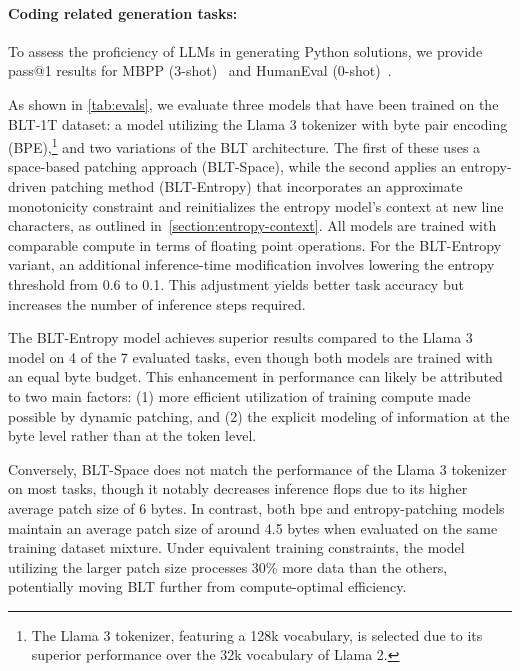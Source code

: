 \paragraph{Coding related generation tasks:}  To assess the proficiency of LLMs in generating Python solutions, we provide pass@1 results for MBPP (3-shot)~\citep{Eval_MBPP} and HumanEval (0-shot)~\citep{Eval_HumanEval}.

As shown in \autoref{tab:evals}, we evaluate three models that have been trained on the {\textsc BLT}-1T dataset: a model utilizing the Llama 3 tokenizer with byte pair encoding (BPE),\footnote{The Llama 3 tokenizer, featuring a 128k vocabulary, is selected due to its superior performance over the 32k vocabulary of Llama 2.} and two variations of the {\textsc BLT} architecture. The first of these uses a space-based patching approach ({\textsc BLT}-Space), while the second applies an entropy-driven patching method ({\textsc BLT}-Entropy) that incorporates an approximate monotonicity constraint and reinitializes the entropy model's context at new line characters, as outlined in~\autoref{section:entropy-context}. All models are trained with comparable compute in terms of floating point operations. For the {\textsc BLT}-Entropy variant, an additional inference-time modification involves lowering the entropy threshold from 0.6 to 0.1. This adjustment yields better task accuracy but increases the number of inference steps required.

The {\textsc BLT}-Entropy model achieves superior results compared to the Llama 3 model on 4 of the 7 evaluated tasks, even though both models are trained with an equal byte budget. This enhancement in performance can likely be attributed to two main factors: (1) more efficient utilization of training compute made possible by dynamic patching, and (2) the explicit modeling of information at the byte level rather than at the token level.

Conversely, {\textsc BLT}-Space does not match the performance of the Llama 3 tokenizer on most tasks, though it notably decreases inference flops due to its higher average patch size of 6 bytes. In contrast, both bpe and entropy-patching models maintain an average patch size of around 4.5 bytes when evaluated on the same training dataset mixture. Under equivalent training constraints, the model utilizing the larger patch size processes 30\% more data than the others, potentially moving {\textsc BLT} further from compute-optimal efficiency.

